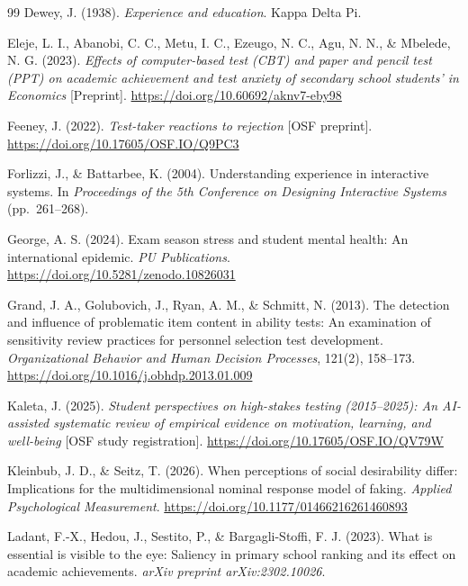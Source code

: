 \documentclass[11pt]{article}
\begin{document}
\begin{thebibliography}{99}
Dewey, J. (1938). \textit{Experience and education}. Kappa Delta Pi.

Eleje, L. I., Abanobi, C. C., Metu, I. C., Ezeugo, N. C., Agu, N. N., \& Mbelede, N. G. (2023). \textit{Effects of computer-based test (CBT) and paper and pencil test (PPT) on academic achievement and test anxiety of secondary school students' in Economics} [Preprint]. \url{https://doi.org/10.60692/aknv7-eby98}

Feeney, J. (2022). \textit{Test-taker reactions to rejection} [OSF preprint]. \url{https://doi.org/10.17605/OSF.IO/Q9PC3}

Forlizzi, J., \& Battarbee, K. (2004). Understanding experience in interactive systems. In \textit{Proceedings of the 5th Conference on Designing Interactive Systems} (pp.\ 261--268).

George, A. S. (2024). Exam season stress and student mental health: An international epidemic. \textit{PU Publications}. \url{https://doi.org/10.5281/zenodo.10826031}

Grand, J. A., Golubovich, J., Ryan, A. M., \& Schmitt, N. (2013). The detection and influence of problematic item content in ability tests: An examination of sensitivity review practices for personnel selection test development. \textit{Organizational Behavior and Human Decision Processes}, 121(2), 158--173. \url{https://doi.org/10.1016/j.obhdp.2013.01.009}

Kaleta, J. (2025). \textit{Student perspectives on high-stakes testing (2015--2025): An AI-assisted systematic review of empirical evidence on motivation, learning, and well-being} [OSF study registration]. \url{https://doi.org/10.17605/OSF.IO/QV79W}

Kleinbub, J. D., \& Seitz, T. (2026). When perceptions of social desirability differ: Implications for the multidimensional nominal response model of faking. \textit{Applied Psychological Measurement}. \url{https://doi.org/10.1177/01466216261460893}

Ladant, F.-X., Hedou, J., Sestito, P., \& Bargagli-Stoffi, F. J. (2023). What is essential is visible to the eye: Saliency in primary school ranking and its effect on academic achievements. \textit{arXiv preprint arXiv:2302.10026}.


\end{thebibliography}
\end{document}
